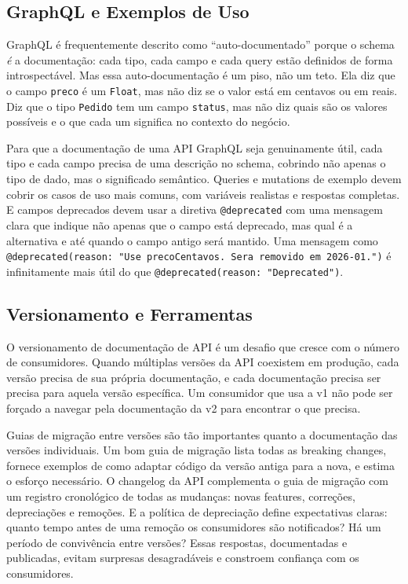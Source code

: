 \subsection{GraphQL e Exemplos de Uso}

GraphQL é frequentemente descrito como ``auto-documentado'' porque o
schema \textit{é} a documentação: cada tipo, cada campo e cada query
estão definidos de forma introspectável. Mas essa auto-documentação é
um piso, não um teto. Ela diz que o campo \texttt{preco} é um
\texttt{Float}, mas não diz se o valor está em centavos ou em reais.
Diz que o tipo \texttt{Pedido} tem um campo \texttt{status}, mas não
diz quais são os valores possíveis e o que cada um significa no contexto
do negócio.

Para que a documentação de uma API GraphQL seja genuinamente útil, cada
tipo e cada campo precisa de uma descrição no schema, cobrindo não apenas o
tipo de dado, mas o significado semântico. Queries e mutations de
exemplo devem cobrir os casos de uso mais comuns, com variáveis
realistas e respostas completas. E campos deprecados devem usar a
diretiva \texttt{@deprecated} com uma mensagem clara que indique não
apenas que o campo está deprecado, mas qual é a alternativa e até
quando o campo antigo será mantido. Uma mensagem como
\texttt{@deprecated(reason: "Use precoCentavos. Sera removido em
2026-01.")} é infinitamente mais útil do que
\texttt{@deprecated(reason: "Deprecated")}.


\subsection{Versionamento e Ferramentas}

O versionamento de documentação de API é um desafio que cresce com
o número de consumidores. Quando múltiplas versões da API coexistem
em produção, cada versão precisa de sua própria documentação, e
cada documentação precisa ser precisa para aquela versão específica.
Um consumidor que usa a v1 não pode ser forçado a navegar pela
documentação da v2 para encontrar o que precisa.

Guias de migração entre versões são tão importantes quanto a
documentação das versões individuais. Um bom guia de migração lista
todas as breaking changes, fornece exemplos de como adaptar código
da versão antiga para a nova, e estima o esforço necessário. O
changelog da API complementa o guia de migração com um registro
cronológico de todas as mudanças: novas features, correções,
depreciações e remoções. E a política de depreciação define
expectativas claras: quanto tempo antes de uma remoção os
consumidores são notificados? Há um período de convivência entre
versões? Essas respostas, documentadas e publicadas, evitam
surpresas desagradáveis e constroem confiança com os consumidores.

